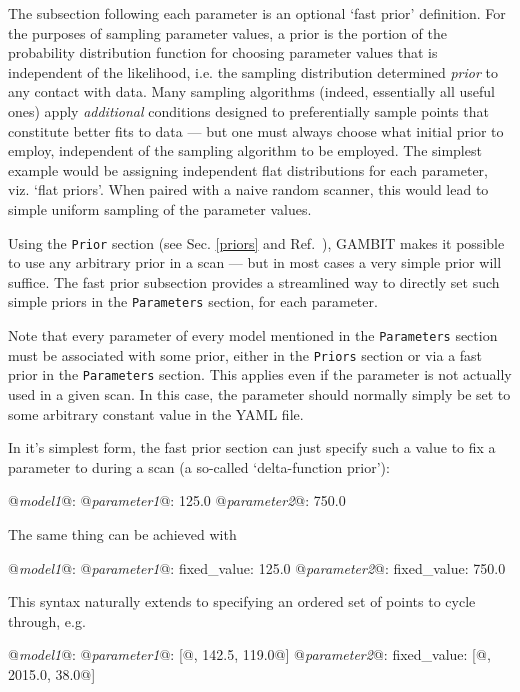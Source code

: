 \documentclass[pdftex,twocolumn,epjc3_preprint,runningheads]{svjour3}
\renewcommand{\_}{\discretionary{\underscore}{}{\underscore}}
\newcommand\yaml[1]{{\lstset{style=yaml}\lstinline!#1!\lstset{style=cpp}}}
\newcommand\yamlvalue[1]{{\YAMLvaluestyle\ttfamily#1}}
\newcommand\YAMLvaluestyle{\footnotesize\color{blue}\mdseries}
\newcommand{\metavarf}[1]{\textit{\color{darkgreen}\footnotesize\textrm{#1}}}
\newcommand{\metavar}{\metavarf}
\newcommand{\gambit}{\textsf{GAMBIT}\xspace}
\newcommand{\GB}{\gambit}
\newcommand\YAML{\textsf{YAML}\xspace}
\begin{document}
The subsection following each parameter is an optional `fast prior' definition.  For the purposes of sampling parameter values, a prior is the portion of the probability distribution function for choosing parameter values that is independent of the likelihood, i.e. the sampling distribution determined \textit{prior} to any contact with data.  Many sampling algorithms (indeed, essentially all useful ones) apply \textit{additional} conditions designed to preferentially sample points that constitute better fits to data --- but one must always choose what initial prior to employ, independent of the sampling algorithm to be employed. The simplest example would be assigning independent flat distributions for each parameter, viz. `flat priors'.  When paired with a naive random scanner, this would lead to simple uniform sampling of the parameter values.

Using the \yaml{Prior} section (see Sec. \ref{priors} and Ref.\ \cite{ScannerBit}), \GB makes it possible to use any arbitrary prior in a scan --- but in most cases a very simple prior will suffice. The fast prior subsection provides a streamlined way to directly set such simple priors in the \yaml{Parameters} section, for each parameter.

Note that every parameter of every model mentioned in the \yaml{Parameters} section must be associated with some prior, either in the \yaml{Priors} section or via a fast prior in the \yaml{Parameters} section.  This applies even if the parameter is not actually used in a given scan.  In this case, the parameter should normally simply be set to some arbitrary constant value in the \YAML file.

In it's simplest form, the fast prior section can just specify such a value to fix a parameter to during a scan (a so-called `delta-function prior'):
\begin{lstyaml}
  @\metavar{model\_1}@:
     @\metavar{parameter\_1}@: 125.0
     @\metavar{parameter\_2}@: 750.0
\end{lstyaml}
The same thing can be achieved with
\begin{lstyaml}
  @\metavar{model\_1}@:
     @\metavar{parameter\_1}@:
       fixed_value: 125.0
     @\metavar{parameter\_2}@:
       fixed_value: 750.0
\end{lstyaml}
This syntax naturally extends to specifying an ordered set of points to cycle through, e.g.
\begin{lstyaml}
  @\metavar{model\_1}@:
     @\metavar{parameter\_1}@: [@\yamlvalue{125.0, 142.5, 119.0}@]
     @\metavar{parameter\_2}@:
       fixed_value: [@\yamlvalue{750.0, 2015.0, 38.0}@]
\end{lstyaml}
\end{document}
